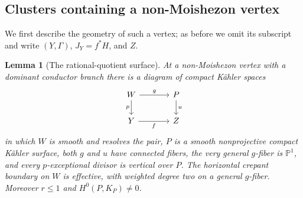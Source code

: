 \documentclass[11pt,letterpaper]{article}
\newcommand{\PP}{\mathbb{P}}
\newtheorem{lemma}[theorem]{Lemma}
\theoremstyle{definition}
\theoremstyle{remark}
\begin{document}
\subsection{Clusters containing a non-Moishezon vertex}

We first describe the geometry of such a vertex; as before we omit
its subscript and write $(Y,\Gamma)$, $J_Y=f^*H$, and $Z$.

\begin{lemma}[The rational-quotient surface]
\label{floor:quotient-surface}
At a non-Moishezon vertex with a dominant conductor branch there is
a diagram of compact K\"ahler spaces
\begin{equation}
 \label{floor:quotient-diagram}
 \begin{tikzcd}[column sep=large]
 W \arrow[r,"g"] \arrow[d,"p"'] & P \arrow[d,"u"]\\
 Y \arrow[r,"f"'] & Z
 \end{tikzcd}
\end{equation}
in which $W$ is smooth and resolves the pair, $P$ is a smooth
nonprojective compact K\"ahler surface, both $g$ and $u$ have
connected fibers, the very general $g$-fiber is $\PP^1$, and every
$p$-exceptional divisor is vertical over $P$.  The horizontal
crepant boundary on $W$ is effective, with weighted degree two on
a general $g$-fiber.  Moreover $r\le1$ and
$H^0(P,K_P)\ne0$.
\end{lemma}
\end{document}
